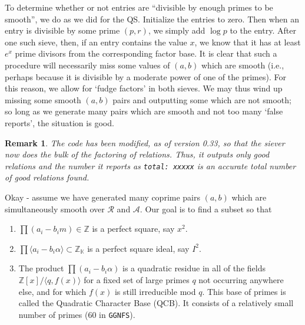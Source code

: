 \documentclass[12pt]{article}
\newtheorem{remark}[thm]{Remark}
\newenvironment{rem}{\begin{remark}\rm}{\end{remark}}
\newcommand{\K}{\mathbb{K}}
\newcommand{\Z}{\mathbb{Z}}
\newcommand{\rfb}{\mathcal{R}}
\newcommand{\afb}{\mathcal{A}}
\newcommand{\ideal}[1]{{\langle #1 \rangle}}
\begin{document}
  To determine whether or not entries are ``divisible by enough
  primes to be smooth'', we do as we did for the QS. Initialize
  the entries to zero. Then when an entry is divisible by some
  prime $(p,r)$, we simply add $\log p$ to the entry. After
  one such sieve, then, if an entry contains the value $x$,
  we know that it has at least $e^x$ prime divisors from
  the corresponding factor base. It is clear that such a procedure
  will necessarily miss some values of $(a,b)$ which are smooth
  (i.e., perhaps because it is divisible by a moderate power
  of one of the primes). For this reason, we allow for `fudge
  factors' in both sieves. We may thus wind up missing some
  smooth $(a,b)$ pairs and outputting some which are not smooth;
  so long as we generate many pairs which are smooth and not too
  many `false reports', the situation is good.

  \begin{rem}
    The code has been modified, as of version 0.33, so that the
    siever now does the bulk of the factoring of relations. Thus,
    it outputs only good relations and the number it reports as
    {\tt total: xxxxx} is an accurate total number of good relations
    found.
  \end{rem}
  
  Okay - assume we have generated many coprime pairs $(a,b)$
  which are simultaneously smooth over $\rfb$ and $\afb$. 
  Our goal is to find a subset so that
  \begin{enumerate}
    \item
      $\prod(a_i - b_im)\in\Z$ is a perfect square, say $x^2$.
    \item
      $\prod\ideal{a_i - b_i\alpha}\subset\Z_\K$ is a perfect square ideal, 
      say $I^2$.
    \item
      The product $\prod(a_i-b_i\alpha)$ is a quadratic residue 
      in all of the fields $\Z[x]/\ideal{q, f(x)}$
      for a fixed set of large primes $q$ not occurring anywhere
      else, and for which $f(x)$ is still irreducible mod $q$.
      This base of primes is called the Quadratic Character
      Base (QCB). It consists of a relatively small number of 
      primes (60 in {\tt GGNFS}).
  \end{enumerate}
\end{document}
